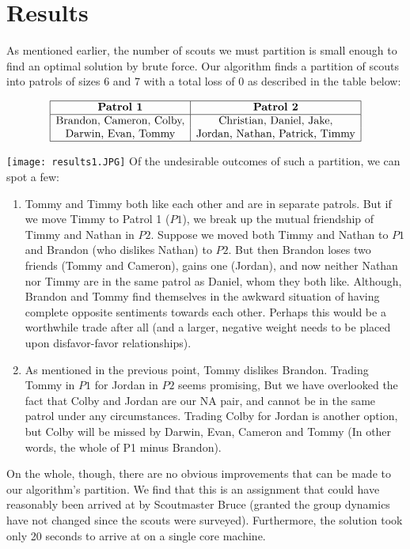 \documentclass{amsart}
\theoremstyle{definition}
\theoremstyle{remark}
\numberwithin{equation}{section}
\begin{document}
\section*{Results}
As mentioned earlier, the number of scouts we must partition is small enough to find an optimal solution by brute force. Our algorithm finds a partition of scouts into patrols of sizes 6 and 7 with a total loss of 0 as described in the table below:
\begin{table}[ht]
	\caption{}\label{eqtable}
	\renewcommand\arraystretch{1.5}
	\noindent\[
	\begin{array}{|c|c|}
	\hline
	\textbf{Patrol 1}&\textbf{Patrol 2}\\
	\hline
	\text{Brandon, Cameron, Colby,}&\text{Christian, Daniel, Jake,}\\
	\text{Darwin, Evan, Tommy}&\text{Jordan, Nathan, Patrick, Timmy}\\
	\hline
	\end{array}
	\]
\end{table}
\texttt{[image: results1.JPG]}
Of the undesirable outcomes of such a partition, we can spot a few:
\begin{enumerate}
	\item Tommy and Timmy both like each other and are in separate patrols. But if we move Timmy to Patrol 1 ($P1$), we break up the mutual friendship of Timmy and Nathan in $P2$. Suppose we moved both Timmy and Nathan to $P1$ and Brandon (who dislikes Nathan) to $P2$. But then Brandon loses two friends (Tommy and Cameron), gains one (Jordan), and now neither Nathan nor Timmy are in the same patrol as Daniel, whom they both like. Although, Brandon and Tommy find themselves in the awkward situation of having complete opposite sentiments towards each other. Perhaps this would be a worthwhile trade after all (and a larger, negative weight needs to be placed upon disfavor-favor relationships).
	
	\item As mentioned in the previous point, Tommy dislikes Brandon. Trading Tommy in $P1$ for Jordan in $P2$ seems promising, But we have overlooked the fact that Colby and Jordan are our NA pair, and cannot be in the same patrol under any circumstances. Trading Colby for Jordan is another option, but Colby will be missed by Darwin, Evan, Cameron and Tommy (In other words, the whole of P1 minus Brandon).
\end{enumerate}
On the whole, though, there are no obvious improvements that can be made to our algorithm’s partition. We find that this is an assignment that could have reasonably been arrived at by Scoutmaster Bruce (granted the group dynamics have not changed since the scouts were surveyed).  Furthermore, the solution took only 20 seconds to arrive at on a single core machine.
\end{document}
